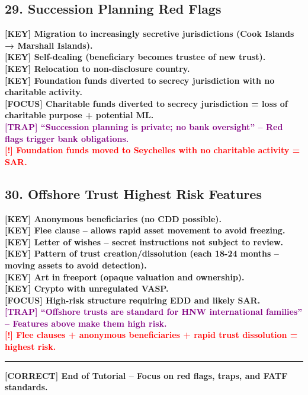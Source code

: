 \documentclass[10pt,a4paper]{article}
\newcommand{\redflag}[1]{\textcolor{red}{\textbf{[!] #1}}}
\newcommand{\greennote}[1]{\textcolor{green!50!black}{\textbf{[CORRECT] #1}}}
\newcommand{\examfocus}[1]{\textcolor{orange!80!black}{\textbf{[FOCUS] #1}}}
\newcommand{\trap}[1]{\textcolor{purple}{\textbf{[TRAP] #1}}}
\newcommand{\keyterm}[1]{\textcolor{red!80!black}{\textbf{[KEY] #1}}}
\begin{document}
\subsection*{29. Succession Planning Red Flags}
\keyterm{Migration to increasingly secretive jurisdictions (Cook Islands → Marshall Islands).} \\
\keyterm{Self-dealing (beneficiary becomes trustee of new trust).} \\
\keyterm{Relocation to non-disclosure country.} \\
\keyterm{Foundation funds diverted to secrecy jurisdiction with no charitable activity.} \\
\examfocus{Charitable funds diverted to secrecy jurisdiction = loss of charitable purpose + potential ML.} \\
\trap{“Succession planning is private; no bank oversight” – Red flags trigger bank obligations.} \\
\redflag{Foundation funds moved to Seychelles with no charitable activity = SAR.}

\subsection*{30. Offshore Trust Highest Risk Features}
\keyterm{Anonymous beneficiaries (no CDD possible).} \\
\keyterm{Flee clause – allows rapid asset movement to avoid freezing.} \\
\keyterm{Letter of wishes – secret instructions not subject to review.} \\
\keyterm{Pattern of trust creation/dissolution (each 18-24 months – moving assets to avoid detection).} \\
\keyterm{Art in freeport (opaque valuation and ownership).} \\
\keyterm{Crypto with unregulated VASP.} \\
\examfocus{High-risk structure requiring EDD and likely SAR.} \\
\trap{“Offshore trusts are standard for HNW international families” – Features above make them high risk.} \\
\redflag{Flee clauses + anonymous beneficiaries + rapid trust dissolution = highest risk.}

\vspace{0.5cm}
\rule{\textwidth}{0.5pt}
\centering
\greennote{End of Tutorial – Focus on red flags, traps, and FATF standards.}
\end{document}
